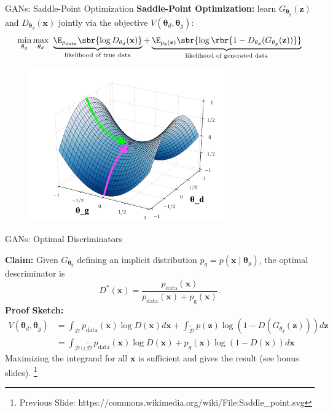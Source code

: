 \documentclass[notheorems]{beamer}
\newcommand{\source}[1]{{\let\thefootnote\relax\footnote{{\tiny #1}}}}
\newcommand{\xx}{\mathbf{x}}
\newcommand{\zz}{\mathbf{z}}
\newcommand{\vtheta}{\mathbf{\theta}}
\begin{document}
    \begin{frame}{GANs: Saddle-Point Optimization}
        \textbf{Saddle-Point Optimization:} learn $G_{\vtheta_g}(\zz)$ and $D_{\vtheta_d}(\xx)$ jointly via the objective $V(\vtheta_d, \vtheta_g)$:
        \[ \min_{\vtheta_g} \max_{\vtheta_d} \ \underbrace{\E_{p_{\text{data}}} \sbr{\log D_{\vtheta_d}(\xx)}}_{\text{likelihood of true data}} + \underbrace{\E_{p_{\zz}(\zz)} \sbr{\log \rbr{1 - D_{\vtheta_d}(G_{\vtheta_g}(\zz))}}}_{\text{likelihood of generated data}} \]
        \vspace{-1cm}
        \begin{figure}
            \centering
            \includegraphics[width=0.75\textwidth]{figures/saddle_point_drawing}
        \end{figure}
    \end{frame}

    \begin{frame}{GANs: Optimal Discriminators}

        \textbf{Claim:} Given $G_{\vtheta_g}$ defining an implicit distribution $p_g = p(\xx \mid \vtheta_g)$,
        the optimal descriminator is
        \[ D^*(\xx) = \frac{p_{\text{data}}(\xx)}{p_{\text{data}}(\xx) + p_{\text{g}}(\xx)}. \]
        \textbf{Proof Sketch:}
        \begin{align*}
            V(\vtheta_d, \vtheta_g) &= \int_{\mathcal{D}} p_{\text{data}}(\xx) \log D(\xx) d \xx + \int_{\mathcal{\tilde D}} p(\zz)\log(1-D(G_{\theta_g}(\zz))) d \zz\\
            &= \int_{\mathcal{D} \cup \mathcal{\tilde D}} p_{\text{data}}(\xx) \log D(\xx) + p_g(\xx)\log(1-D(\xx)) d \xx
        \end{align*}
        Maximizing the integrand for all $\xx$ is sufficient and gives the result (see bonus slides).
        \source{Previous Slide: https://commons.wikimedia.org/wiki/File:Saddle\_point.svg}
    \end{frame}
\end{document}
